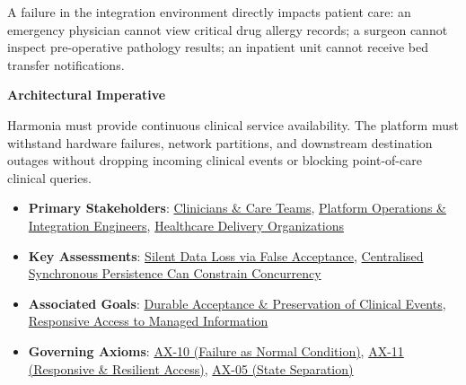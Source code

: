 A failure in the integration environment directly impacts patient care: an emergency physician cannot view critical drug allergy records; a surgeon cannot inspect pre-operative pathology results; an inpatient unit cannot receive bed transfer notifications.



\par\medskip\textbf{Architectural Imperative}\par


Harmonia must provide continuous clinical service availability. The platform must withstand hardware failures, network partitions, and downstream destination outages without dropping incoming clinical events or blocking point-of-care clinical queries.



\begin{itemize}


\item \textbf{Primary Stakeholders}: \href{\detokenize{../../../../../docs/markdown/01-motivation/stakeholders/enterprise-stakeholders.md}}{Clinicians \& Care Teams}, \href{\detokenize{../../../../../docs/markdown/01-motivation/stakeholders/enterprise-stakeholders.md}}{Platform Operations \& Integration Engineers}, \href{\detokenize{../../../../../docs/markdown/01-motivation/stakeholders/enterprise-stakeholders.md}}{Healthcare Delivery Organizations}

\item \textbf{Key Assessments}: \href{\detokenize{../../../../../docs/markdown/01-motivation/drivers-assessments/assessments.md}}{Silent Data Loss via False Acceptance}, \href{\detokenize{../../../../../docs/markdown/01-motivation/drivers-assessments/assessments.md}}{Centralised Synchronous Persistence Can Constrain Concurrency}

\item \textbf{Associated Goals}: \href{\detokenize{../../../../../docs/markdown/01-motivation/goals-outcomes/strategic-goals.md}}{Durable Acceptance \& Preservation of Clinical Events}, \href{\detokenize{../../../../../docs/markdown/01-motivation/goals-outcomes/strategic-goals.md}}{Responsive Access to Managed Information}

\item \textbf{Governing Axioms}: \hyperref[element:0d9673833eb840eab03804aa076c1b0c]{AX-10 (Failure as Normal Condition)}, \hyperref[element:8a1e995f16954484a78ae1c5c114d546]{AX-11 (Responsive \& Resilient Access)}, \hyperref[element:0412a2084f0145babc4f022c71fea65f]{AX-05 (State Separation)}

\end{itemize}

